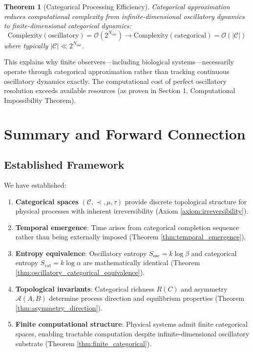 \documentclass[11pt]{article}
\newtheorem{theorem}{Theorem}[section]
\theoremstyle{remark}
\begin{document}
\begin{theorem}[Categorical Processing Efficiency]
\label{thm:categorical_efficiency}
Categorical approximation reduces computational complexity from infinite-dimensional oscillatory dynamics to finite-dimensional categorical dynamics:
\begin{equation}
\text{Complexity}(\text{oscillatory}) = \mathcal{O}(2^{N_{\text{osc}}}) \to \text{Complexity}(\text{categorical}) = \mathcal{O}(|\mathcal{C}|)
\end{equation}
where typically $|\mathcal{C}| \ll 2^{N_{\text{osc}}}$.
\end{theorem}

This explains why finite observers—including biological systems—necessarily operate through categorical approximation rather than tracking continuous oscillatory dynamics exactly. The computational cost of perfect oscillatory resolution exceeds available resources (as proven in Section 1, Computational Impossibility Theorem).

\section{Summary and Forward Connection}

\subsection{Established Framework}

We have established:

\begin{enumerate}
\item \textbf{Categorical spaces} $(\mathcal{C}, \prec, \mu, \tau)$ provide discrete topological structure for physical processes with inherent irreversibility (Axiom \ref{axiom:irreversibility}).

\item \textbf{Temporal emergence}: Time arises from categorical completion sequence rather than being externally imposed (Theorem \ref{thm:temporal_emergence}).

\item \textbf{Entropy equivalence}: Oscillatory entropy $S_{\text{osc}} = k \log \beta$ and categorical entropy $S_{\text{cat}} = k \log \alpha$ are mathematically identical (Theorem \ref{thm:oscillatory_categorical_equivalence}).

\item \textbf{Topological invariants}: Categorical richness $R(C)$ and asymmetry $\mathcal{A}(A,B)$ determine process direction and equilibrium properties (Theorem \ref{thm:asymmetry_direction}).

\item \textbf{Finite computational structure}: Physical systems admit finite categorical spaces, enabling tractable computation despite infinite-dimensional oscillatory substrate (Theorem \ref{thm:finite_categorical}).
\end{enumerate}
\end{document}
